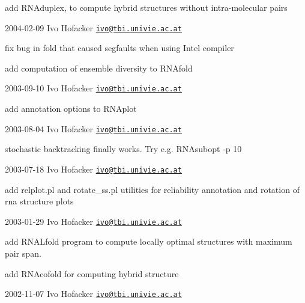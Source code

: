 \begin{DoxyItemize}
\item add R\+N\+Aduplex, to compute hybrid structures without intra-\/molecular pairs
\end{DoxyItemize}

2004-\/02-\/09 Ivo Hofacker \href{mailto:ivo@tbi.univie.ac.at}{\tt ivo@tbi.\+univie.\+ac.\+at}


\begin{DoxyItemize}
\item fix bug in fold that caused segfaults when using Intel compiler
\item add computation of ensemble diversity to R\+N\+Afold
\end{DoxyItemize}

2003-\/09-\/10 Ivo Hofacker \href{mailto:ivo@tbi.univie.ac.at}{\tt ivo@tbi.\+univie.\+ac.\+at}


\begin{DoxyItemize}
\item add annotation options to R\+N\+Aplot
\end{DoxyItemize}

2003-\/08-\/04 Ivo Hofacker \href{mailto:ivo@tbi.univie.ac.at}{\tt ivo@tbi.\+univie.\+ac.\+at}


\begin{DoxyItemize}
\item stochastic backtracking finally works. Try e.\+g. R\+N\+Asubopt -\/p 10
\end{DoxyItemize}

2003-\/07-\/18 Ivo Hofacker \href{mailto:ivo@tbi.univie.ac.at}{\tt ivo@tbi.\+univie.\+ac.\+at}


\begin{DoxyItemize}
\item add relplot.\+pl and rotate\+\_\+ss.\+pl utilities for reliability annotation and rotation of rna structure plots
\end{DoxyItemize}

2003-\/01-\/29 Ivo Hofacker \href{mailto:ivo@tbi.univie.ac.at}{\tt ivo@tbi.\+univie.\+ac.\+at}


\begin{DoxyItemize}
\item add R\+N\+A\+Lfold program to compute locally optimal structures with maximum pair span.
\item add R\+N\+Acofold for computing hybrid structure
\end{DoxyItemize}

2002-\/11-\/07 Ivo Hofacker \href{mailto:ivo@tbi.univie.ac.at}{\tt ivo@tbi.\+univie.\+ac.\+at}


